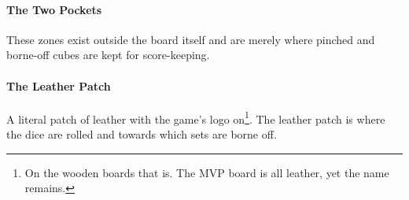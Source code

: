 \paragraph{The Two Pockets} These zones exist outside the board itself and are merely where pinched and borne-off cubes are kept for score-keeping.
\paragraph{The Leather Patch} A literal patch of leather with the game's logo on\footnote{On the wooden boards that is. The MVP board is all leather, yet the name remains.}.
The leather patch is where the dice are rolled and towards which sets are borne off.